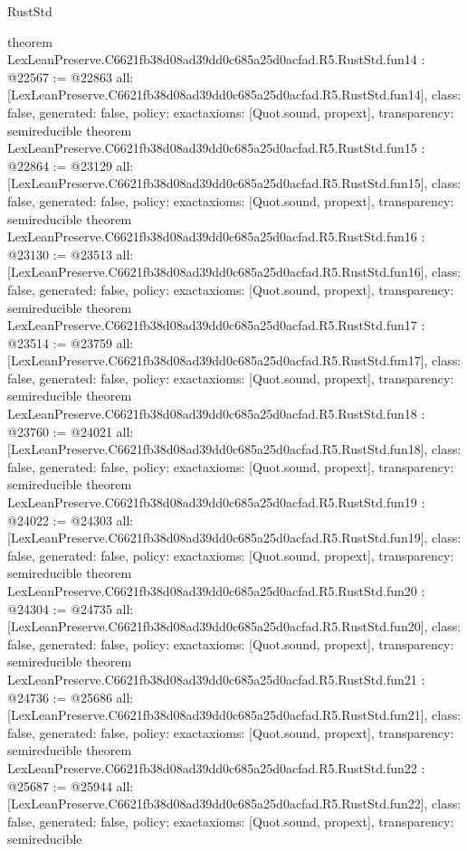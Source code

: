 \begin{lexlean}{RustStd}
\begin{coremodule}
{}
theorem LexLeanPreserve.C6621fb38d08ad39dd0c685a25d0acfad.R5.RustStd.fun14 : @22567 := @22863 {
  all: [LexLeanPreserve.C6621fb38d08ad39dd0c685a25d0acfad.R5.RustStd.fun14],
  class: false,
  generated: false,
  policy: exact{axioms: [Quot.sound, propext]},
  transparency: semireducible
}
theorem LexLeanPreserve.C6621fb38d08ad39dd0c685a25d0acfad.R5.RustStd.fun15 : @22864 := @23129 {
  all: [LexLeanPreserve.C6621fb38d08ad39dd0c685a25d0acfad.R5.RustStd.fun15],
  class: false,
  generated: false,
  policy: exact{axioms: [Quot.sound, propext]},
  transparency: semireducible
}
theorem LexLeanPreserve.C6621fb38d08ad39dd0c685a25d0acfad.R5.RustStd.fun16 : @23130 := @23513 {
  all: [LexLeanPreserve.C6621fb38d08ad39dd0c685a25d0acfad.R5.RustStd.fun16],
  class: false,
  generated: false,
  policy: exact{axioms: [Quot.sound, propext]},
  transparency: semireducible
}
theorem LexLeanPreserve.C6621fb38d08ad39dd0c685a25d0acfad.R5.RustStd.fun17 : @23514 := @23759 {
  all: [LexLeanPreserve.C6621fb38d08ad39dd0c685a25d0acfad.R5.RustStd.fun17],
  class: false,
  generated: false,
  policy: exact{axioms: [Quot.sound, propext]},
  transparency: semireducible
}
theorem LexLeanPreserve.C6621fb38d08ad39dd0c685a25d0acfad.R5.RustStd.fun18 : @23760 := @24021 {
  all: [LexLeanPreserve.C6621fb38d08ad39dd0c685a25d0acfad.R5.RustStd.fun18],
  class: false,
  generated: false,
  policy: exact{axioms: [Quot.sound, propext]},
  transparency: semireducible
}
theorem LexLeanPreserve.C6621fb38d08ad39dd0c685a25d0acfad.R5.RustStd.fun19 : @24022 := @24303 {
  all: [LexLeanPreserve.C6621fb38d08ad39dd0c685a25d0acfad.R5.RustStd.fun19],
  class: false,
  generated: false,
  policy: exact{axioms: [Quot.sound, propext]},
  transparency: semireducible
}
theorem LexLeanPreserve.C6621fb38d08ad39dd0c685a25d0acfad.R5.RustStd.fun20 : @24304 := @24735 {
  all: [LexLeanPreserve.C6621fb38d08ad39dd0c685a25d0acfad.R5.RustStd.fun20],
  class: false,
  generated: false,
  policy: exact{axioms: [Quot.sound, propext]},
  transparency: semireducible
}
theorem LexLeanPreserve.C6621fb38d08ad39dd0c685a25d0acfad.R5.RustStd.fun21 : @24736 := @25686 {
  all: [LexLeanPreserve.C6621fb38d08ad39dd0c685a25d0acfad.R5.RustStd.fun21],
  class: false,
  generated: false,
  policy: exact{axioms: [Quot.sound, propext]},
  transparency: semireducible
}
theorem LexLeanPreserve.C6621fb38d08ad39dd0c685a25d0acfad.R5.RustStd.fun22 : @25687 := @25944 {
  all: [LexLeanPreserve.C6621fb38d08ad39dd0c685a25d0acfad.R5.RustStd.fun22],
  class: false,
  generated: false,
  policy: exact{axioms: [Quot.sound, propext]},
  transparency: semireducible
}
\end{coremodule}
\end{lexlean}
